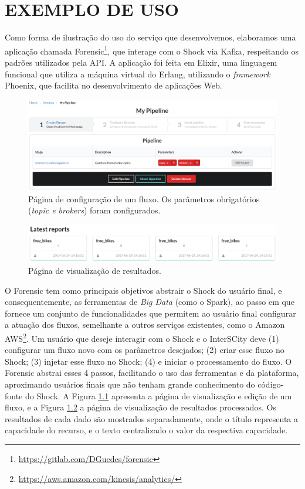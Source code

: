 \chapter[EXEMPLO DE USO]{EXEMPLO DE USO}
\label{chapter:example}

Como forma de ilustração do uso do serviço que desenvolvemos, elaboramos uma
aplicação chamada
Forensic\footnote{\url{https://gitlab.com/DGuedes/forensic}}, que interage
com o Shock via Kafka, respeitando os padrões utilizados pela API. A aplicação
foi feita em Elixir, uma linguagem funcional que utiliza a máquina virtual do
Erlang, utilizando o \textit{framework} Phoenix, que facilita no desenvolvimento
de aplicações Web.

\begin{figure}[hbt]
  \centering
  \includegraphics[width=\textwidth]{figuras/pipeline.png}
    \caption{Página de configuração de um fluxo. Os parâmetros
obrigatórios (\textit{topic e brokers}) foram configurados.}
  \label{fig:forensicparams}
\end{figure}

\begin{figure}[hbt]
  \centering
  \includegraphics[width=\textwidth]{figuras/latest-reports.png}
    \caption{Página de visualização de resultados.}
  \label{fig:reports}
\end{figure}

O Forensic tem como principais objetivos abstrair o Shock do usuário final,
e consequentemente, as ferramentas de \textit{Big Data} (como o Spark), ao passo em que
fornece um conjunto de funcionalidades que permitem ao usuário final configurar
a atuação dos fluxos, semelhante a outros serviços existentes,
como o Amazon AWS\footnote{\url{https://aws.amazon.com/kinesis/analytics/}}.
Um usuário que deseje interagir com o Shock e o InterSCity deve
(1) configurar um fluxo novo com os
parâmetros desejados; (2) criar esse fluxo no Shock; (3) injetar
esse fluxo no Shock; (4) e iniciar o processamento do fluxo.
O Forensic abstrai esses 4 passos, facilitando o uso
das ferramentas e da plataforma, aproximando usuários finais que não tenham
grande conhecimento do código-fonte do Shock. A Figura \ref{fig:forensicparams}
apresenta a página de visualização e edição de um fluxo, e a Figura
\ref{fig:reports} a página de visualização de resultados processados. Os
resultados de cada dado são mostrados separadamente, onde o título representa
a capacidade do recurso, e o texto centralizado o valor da respectiva capacidade.

